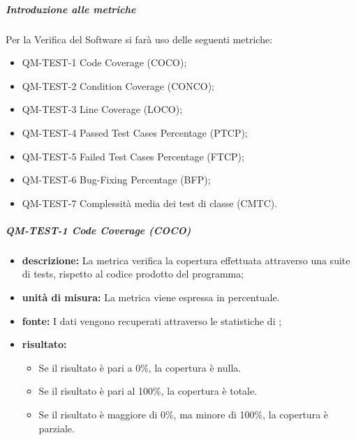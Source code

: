         \subparagraph{Introduzione alle metriche}

             Per la Verifica del Software si farà uso delle seguenti metriche:

            \begin{itemize}

                \item QM-TEST-1 Code Coverage (COCO);
                \item QM-TEST-2 Condition Coverage (CONCO);
                \item QM-TEST-3 Line Coverage (LOCO);
                \item QM-TEST-4 Passed Test Cases Percentage (PTCP);
                \item QM-TEST-5 Failed Test Cases Percentage (FTCP);
                \item QM-TEST-6 Bug-Fixing Percentage (BFP);
                \item QM-TEST-7 Complessità media dei test di classe (CMTC).
            \end{itemize}

                
            \subparagraph{QM-TEST-1 Code Coverage (COCO)}
            \begin{itemize}
                \item \textbf{descrizione: }
                    La metrica verifica la copertura effettuata attraverso una suite di tests, rispetto al codice prodotto del programma;

                \item \textbf{unità di misura: }
                La metrica viene espressa in percentuale.

                \item \textbf{fonte: }
                    I dati vengono recuperati attraverso le statistiche di ;

                \item \textbf{risultato: }
                \begin{itemize}
                    \item Se il risultato è pari a 0\%, la copertura è nulla.
                    \item Se il risultato è pari al 100\%, la copertura è totale.
                    \item Se il risultato è maggiore di 0\%, ma minore di 100\%, la copertura è parziale.
                \end{itemize}
            \end{itemize}



